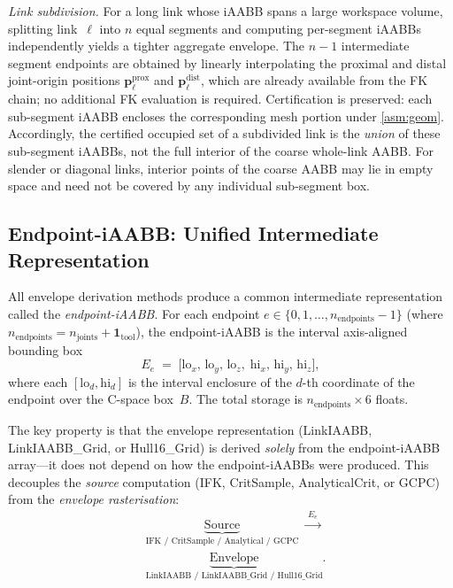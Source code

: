 \documentclass[journal]{IEEEtran}
\begin{document}
\emph{Link subdivision.}
For a long link whose iAABB spans a large workspace volume,
splitting link~$\ell$ into $n$ equal segments and computing per-segment
iAABBs independently yields a tighter aggregate envelope.
The $n{-}1$ intermediate segment endpoints are obtained by linearly
interpolating the proximal and distal joint-origin positions
$\bm{p}_\ell^{\mathrm{prox}}$ and $\bm{p}_\ell^{\mathrm{dist}}$,
which are already available from the FK chain; no additional FK
evaluation is required.
Certification is preserved: each sub-segment iAABB encloses the
corresponding mesh portion under \cref{asm:geom}.
Accordingly, the certified occupied set of a subdivided link is the
\emph{union} of these sub-segment iAABBs, not the full interior of the
coarse whole-link AABB. For slender or diagonal links, interior points of
the coarse AABB may lie in empty space and need not be covered by any
individual sub-segment box.

\subsection{Endpoint-iAABB: Unified Intermediate Representation}%
\label{sec:endpoint_iaabb}

All envelope derivation methods produce a common intermediate
representation called the \emph{endpoint-iAABB}.
For each endpoint $e \in \{0,1,\ldots,n_\text{endpoints}-1\}$
(where $n_\text{endpoints} = n_\text{joints} + \mathbf{1}_\text{tool}$),
the endpoint-iAABB is the interval axis-aligned bounding box
\begin{equation}\label{eq:ep_iaabb}
  E_{e} \;=\;
  \bigl[\mathrm{lo}_x,\,\mathrm{lo}_y,\,\mathrm{lo}_z,\;
        \mathrm{hi}_x,\,\mathrm{hi}_y,\,\mathrm{hi}_z\bigr],
\end{equation}
where each $[\mathrm{lo}_d,\mathrm{hi}_d]$ is the interval enclosure
of the $d$-th coordinate of the endpoint over the C-space
box~$B$.
The total storage is $n_\text{endpoints} \times 6$ floats.

The key property is that the envelope representation (LinkIAABB,
LinkIAABB\_Grid, or Hull16\_Grid) is derived \emph{solely} from
the endpoint-iAABB array---it does not depend on how the
endpoint-iAABBs were produced.
This decouples the \emph{source} computation
(IFK, CritSample, AnalyticalCrit, or GCPC) from the
\emph{envelope rasterisation}:
\begin{equation}\label{eq:pipeline}
  \begin{aligned}
    &\underbrace{\text{Source}}_{\text{IFK / CritSample / Analytical / GCPC}}
    \;\xrightarrow{\;E_e\;} \\
    &\underbrace{\text{Envelope}}_{\text{LinkIAABB / LinkIAABB\_Grid / Hull16\_Grid}}.
  \end{aligned}
\end{equation}
\end{document}
